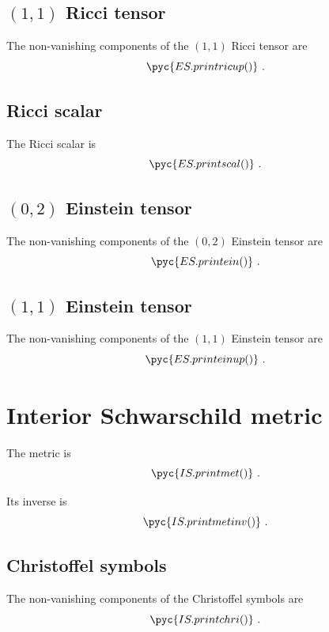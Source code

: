\documentclass[a4paper, 12pt]{memoir}
\begin{document}
\section{$(1,1)$ Ricci tensor}
    The non-vanishing components of the $(1,1)$ Ricci tensor are
    \begin{equation*}
        \pyc{ES.printricup()} ~.
    \end{equation*}

\section{Ricci scalar}
    The Ricci scalar is
    \begin{equation*}
        \pyc{ES.printscal()} ~.
    \end{equation*}

\section{$(0,2)$ Einstein tensor}
    The non-vanishing components of the $(0,2)$ Einstein tensor are
    \begin{equation*}
        \pyc{ES.printein()} ~.
    \end{equation*}

\section{$(1,1)$ Einstein tensor}
    The non-vanishing components of the $(1,1)$ Einstein tensor are
    \begin{equation*}
        \pyc{ES.printeinup()} ~.
    \end{equation*}

\chapter{Interior Schwarschild metric}

    The metric is 
    \begin{equation*}
        \pyc{IS.printmet()} ~.
    \end{equation*}

    Its inverse is 
    \begin{equation*}
        \pyc{IS.printmetinv()} ~.
    \end{equation*}

\section{Christoffel symbols}
    The non-vanishing components of the Christoffel symbols are
    \begin{equation*}
        \pyc{IS.printchri()} ~.
    \end{equation*}
\end{document}
